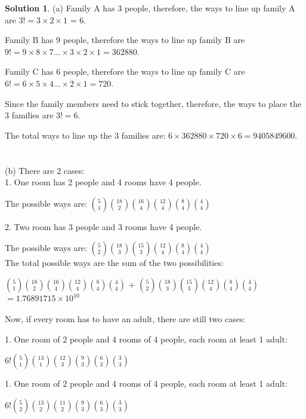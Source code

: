 \documentclass{article}
\theoremstyle{definition}
\newtheorem*{solution}{Solution}
\begin{document}
\begin{solution}
(a) Family A has 3 people, therefore, the ways to line up family A are \(3! = 3\times2\times1\) = 6.

Family B has 9 people, therefore the ways to line up family B are \(9! = 9\times8\times7...\times3\times2\times1 = 362880\).

Family C has 6 people, therefore the ways to line up family C are \(6! = 6\times5\times4...\times2\times1 = 720\).

Since the family members need to stick together, therefore, the ways to place the 3 families are \(3! = 6\).

The total ways to line up the 3 families are: \(6\times362880\times720\times6 = 9405849600\).\\\\\\

(b) There are 2 cases:\\

1. One room has 2 people and 4 rooms have 4 people.

The possible ways are: \(5\choose1\)\(18\choose2\)\(16\choose4\)\(12\choose4\)\(8\choose4\)\(4\choose4\)

2. Two room has 3 people and 3 rooms have 4 people.

The possible ways are: \(5\choose2\)\(18\choose3\)\(15\choose3\)\(12\choose4\)\(8\choose4\)\(4\choose4\)\\

The total possible ways are the sum of the two possibilities:

\(5\choose1\)\(18\choose2\)\(16\choose4\)\(12\choose4\)\(8\choose4\)\(4\choose4\) +  \(5\choose2\)\(18\choose3\)\(15\choose3\)\(12\choose4\)\(8\choose4\)\(4\choose4\) \(= 1.76891715\times10^{10}\)\\\\


Now, if every room has to have an adult, there are still two cases:

1. One room of 2 people and 4 rooms of 4 people, each room at least 1 adult:

\(6!\)\(5\choose1\)\(13\choose1\)\(12\choose3\)\(9\choose3\)\(6\choose3\)\(3\choose3\)

1. One room of 2 people and 4 rooms of 4 people, each room at least 1 adult:

\(6!\)\(5\choose2\)\(13\choose2\)\(11\choose2\)\(9\choose3\)\(6\choose3\)\(3\choose3\)\\


\end{solution}
\end{document}
